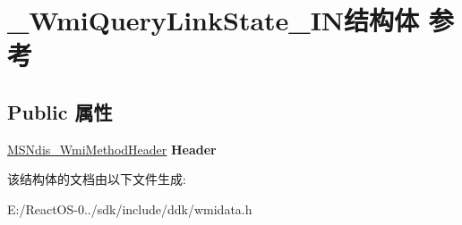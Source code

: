\hypertarget{struct___wmi_query_link_state___i_n}{}\section{\+\_\+\+Wmi\+Query\+Link\+State\+\_\+\+I\+N结构体 参考}
\label{struct___wmi_query_link_state___i_n}
\subsection*{Public 属性}
\begin{DoxyCompactItemize}
\item 
\mbox{\label{struct___wmi_query_link_state___i_n_a056363d2da2b7c64748613b97f7b1877}} 
\hyperlink{struct___m_s_ndis___wmi_method_header}{M\+S\+Ndis\+\_\+\+Wmi\+Method\+Header} {\bfseries Header}
\end{DoxyCompactItemize}


该结构体的文档由以下文件生成\+:\begin{DoxyCompactItemize}
\item 
E\+:/\+React\+O\+S-\/0../sdk/include/ddk/wmidata.\+h\end{DoxyCompactItemize}
